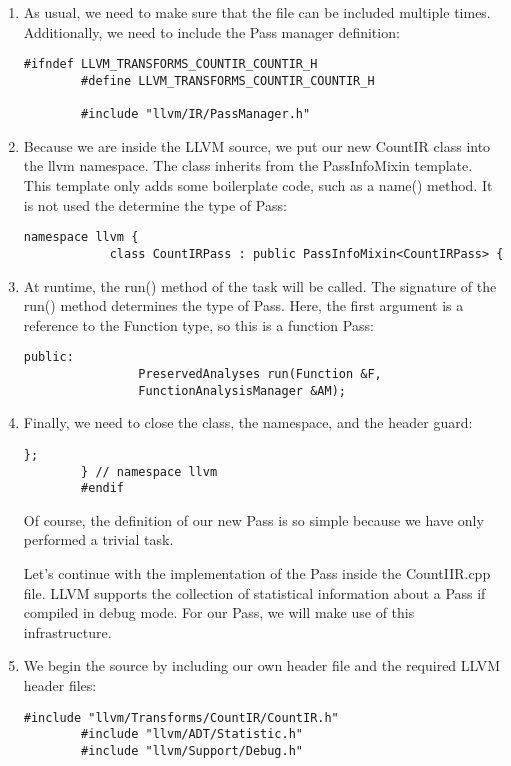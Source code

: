 \begin{enumerate}
	\item As usual, we need to make sure that the file can be included multiple times. Additionally, we need to include the Pass manager definition:
	\begin{lstlisting}[caption={}]
		#ifndef LLVM_TRANSFORMS_COUNTIR_COUNTIR_H
		#define LLVM_TRANSFORMS_COUNTIR_COUNTIR_H
		
		#include "llvm/IR/PassManager.h"
	\end{lstlisting}
	
	\item Because we are inside the LLVM source, we put our new CountIR class into the llvm namespace. The class inherits from the PassInfoMixin template. This template only adds some boilerplate code, such as a name() method. It is not used the determine the type of Pass:
	\begin{lstlisting}[caption={}]
		namespace llvm {
			class CountIRPass : public PassInfoMixin<CountIRPass> {
			\end{lstlisting}
			
			\item At runtime, the run() method of the task will be called. The signature of the run() method determines the type of Pass. Here, the first argument is a reference to the Function type, so this is a function Pass:
			\begin{lstlisting}[caption={}]
				public:
				PreservedAnalyses run(Function &F,
				FunctionAnalysisManager &AM);
			\end{lstlisting}
			
			\item Finally, we need to close the class, the namespace, and the header guard:
			\begin{lstlisting}[caption={}]
			};
		} // namespace llvm
		#endif
	\end{lstlisting}
	Of course, the definition of our new Pass is so simple because we have only performed a trivial task.\par
	
	Let's continue with the implementation of the Pass inside the CountIIR.cpp file. LLVM supports the collection of statistical information about a Pass if compiled in debug mode. For our Pass, we will make use of this infrastructure.\par
	
	\item We begin the source by including our own header file and the required LLVM header files:
	\begin{lstlisting}[caption={}]
		#include "llvm/Transforms/CountIR/CountIR.h"
		#include "llvm/ADT/Statistic.h"
		#include "llvm/Support/Debug.h"
	\end{lstlisting}
	

\end{enumerate}
